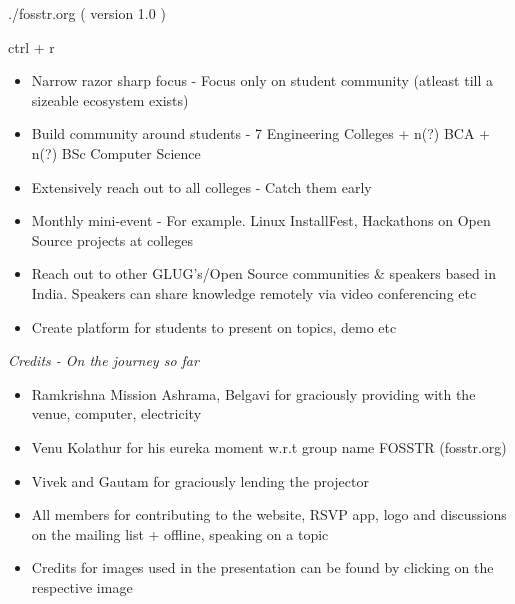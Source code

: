 \documentclass{beamer}
\begin{document}
\begin{frame}{}
\begin{center}
./fosstr.org ( version 1.0 )
\end{center}
\end{frame}



\begin{frame}{ctrl + r}
\begin{center}
\begin{itemize}
\item Narrow razor sharp focus - Focus only on student community (atleast till a sizeable ecosystem exists)
\item Build community around students - 7 Engineering Colleges + n(?) BCA + n(?) BSc Computer Science
\item Extensively reach out to all colleges - Catch them early
\item Monthly mini-event - For example. Linux InstallFest, Hackathons on Open Source projects at colleges
\item Reach out to other GLUG's/Open Source communities \& speakers based in India. Speakers can share knowledge remotely via video conferencing etc
\item Create platform for students to present on topics, demo etc
\end{itemize}
\end{center}
\end{frame}





\begin{frame}{\textit{ Credits - On the journey so far }}
\begin{itemize}
\item Ramkrishna Mission Ashrama, Belgavi for graciously providing with the venue, computer, electricity
\item Venu Kolathur for his eureka moment w.r.t group name FOSSTR (fosstr.org)
\item Vivek and Gautam for graciously lending the projector
\item All members for contributing to the website, RSVP app, logo and discussions on the mailing list + offline, speaking on a topic
\item Credits for images used in the presentation can be found by clicking on the respective image
\end{itemize}
\end{frame}
\end{document}
